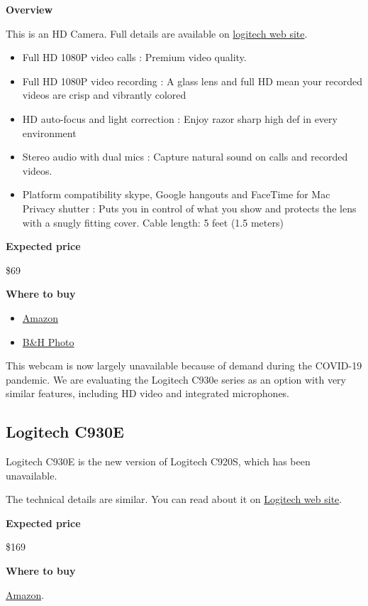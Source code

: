 \begin{gram}
\textbf{Overview}

This is an HD Camera.  Full details are available on 
%
\href{https://www.logitech.com/en-us/product/hd-pro-webcam-c920s}{logitech web site}.
%
\begin{itemize}
\item
Full HD 1080P video calls : Premium video quality.
\item
Full HD 1080P video recording : A glass lens and full HD mean your recorded videos are crisp and vibrantly colored
\item
HD auto-focus and light correction : Enjoy razor sharp high def in every environment

\item
Stereo audio with dual mics : Capture natural sound on calls and recorded videos. 

\item 
Platform compatibility skype, Google hangouts and FaceTime for Mac
Privacy shutter : Puts you in control of what you show and protects the lens with a snugly fitting cover. Cable length: 5 feet (1.5 meters)
\end{itemize}


\textbf{Expected price}

\$69

\textbf{Where to buy}

\begin{itemize}
\item
\href{https://www.amazon.com/Logitech-Widescreen-Calling-Recording-Desktop/dp/B006JH8T3S/ref=sr_1_2?crid=2T6CQ3HNRR1XR&keywords=logitech+c920&qid=1582900645&s=electronics&sprefix=logitech+c,electronics,172&sr=1-2}{Amazon}
\item
\href{https://www.bhphotovideo.com/c/product/1461727-REG/logitech_960_001257_c920s_hd_pro_webcam.html}{B\&H Photo}
\end{itemize}

This webcam is now largely unavailable because of demand during the
COVID-19 pandemic. We are evaluating the Logitech C930e series as an
option with very similar features, including HD video and integrated
microphones.
\end{gram}

\subsection{Logitech C930E}

\begin{gram}
Logitech C930E is the new version of Logitech C920S, which has been unavailable.

The technical details are similar.  You can read about it on
%
\href{https://www.logitech.com/en-us/product/c930e-webcam}{Logitech web site}.

\textbf{Expected price}

\$169

\textbf{Where to buy}

\href{https://www.amazon.com/Logitech-C930e-1080P-Video-Webcam/dp/B00CRJWW2G}{Amazon}.


\end{gram}

